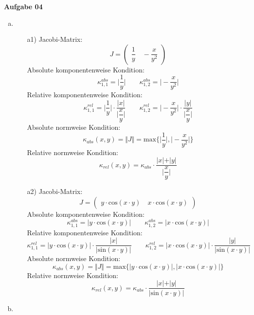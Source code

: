 \documentclass[a4paper,10pt]{article}
\begin{document}
	\newpage
	\textbf{Aufgabe 04}\\
	\begin{enumerate}[a)]
		\item
		\begin{enumerate}
			\item[a1)]
			Jacobi-Matrix:
			\[
			J = 
			\begin{pmatrix}
			\dfrac{1}{y} \quad -\dfrac{x}{y^2}
			\end{pmatrix}
			\]
			Absolute komponentenweise Kondition:
			\[
			\kappa^{abs}_{1,1} = \Big\vert \dfrac{1}{y} \Big\vert \quad\quad \kappa^{abs}_{1,2} = \Big\vert -\dfrac{x}{y^2} \Big \vert
			\]
			Relative komponentenweise Kondition:
			\[
			\kappa^{rel}_{1,1} = \Big\vert \dfrac{1}{y}\Big\vert \cdot \dfrac{\vert x \vert}{\Big \vert \dfrac{x}{y} \Big\vert} \quad\quad \kappa^{rel}_{1,2} = \Big\vert -\dfrac{x}{y^2}\Big\vert \cdot \dfrac{\vert y \vert}{\Big \vert \dfrac{x}{y} \Big\vert}
			\]
			Absolute normweise Kondition:
			\[
			\kappa_{abs}(x,y) = \Vert J \Vert = \mathrm{max}\{\Big\vert \dfrac{1}{y} \Big\vert,  \Big\vert -\dfrac{x}{y^2} \Big \vert\}
			\]
			Relative normweise Kondition:
			\[
			\kappa_{rel}(x,y) =\kappa_{abs} \cdot \dfrac{\vert x \vert + \vert y \vert}{\Big\vert \dfrac{x}{y} \Big \vert}
			\]
			\item[a2)]
			Jacobi-Matrix:
			\[
			J = 
			\begin{pmatrix}
			y \cdot \mathrm{cos}(x \cdot y) \quad x \cdot \mathrm{cos}(x \cdot y)
			\end{pmatrix}
			\]
			Absolute komponentenweise Kondition:
			\[
			\kappa^{abs}_{1,1} = \Big\vert y \cdot \mathrm{cos}(x \cdot y) \Big\vert \quad\quad \kappa^{abs}_{1,2} = \Big\vert x \cdot \mathrm{cos}(x \cdot y) \Big \vert
			\]
			Relative komponentenweise Kondition:
			\[
			\kappa^{rel}_{1,1} = \Big\vert y \cdot \mathrm{cos}(x \cdot y) \Big\vert \cdot \dfrac{\vert x \vert}{\Big \vert \mathrm{sin}(x \cdot y) \Big\vert} \quad\quad \kappa^{rel}_{1,2} = \Big\vert x \cdot \mathrm{cos}(x \cdot y) \Big\vert \cdot \dfrac{\vert y \vert}{\Big \vert \mathrm{sin}(x \cdot y) \Big\vert}
			\]
			Absolute normweise Kondition:
			\[
			\kappa_{abs}(x,y) = \Vert J \Vert = \mathrm{max}\{\vert y \cdot \mathrm{cos}(x \cdot y)\vert , \vert x \cdot \mathrm{cos}(x \cdot y) \vert\}
			\]
			Relative normweise Kondition:
			\[
			\kappa_{rel}(x,y) = \kappa_{abs} \cdot \dfrac{\vert x \vert + \vert y \vert}{\vert \mathrm{sin}(x \cdot y) \vert}
			\]
		\end{enumerate}
		\newpage
		\item

\end{enumerate}
\end{document}
